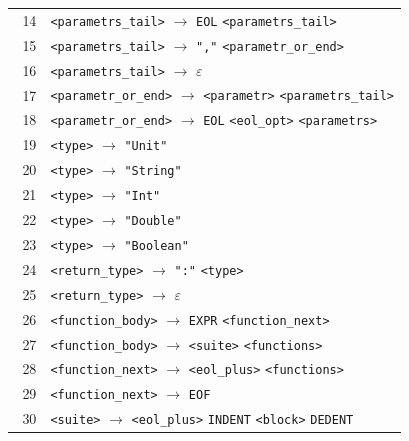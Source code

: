 \documentclass[11pt,a4paper]{article}
\begin{document}
\begin{longtable}{@{}r@{\quad}>{\raggedright\arraybackslash}p{0.91\linewidth}@{}}
14 & \texttt{\textless{}parametrs\_tail\textgreater{}} $\rightarrow$ \texttt{EOL} \texttt{\textless{}parametrs\_tail\textgreater{}} \\
15 & \texttt{\textless{}parametrs\_tail\textgreater{}} $\rightarrow$ \texttt{","} \texttt{\textless{}parametr\_or\_end\textgreater{}} \\
16 & \texttt{\textless{}parametrs\_tail\textgreater{}} $\rightarrow$ $\varepsilon$ \\
17 & \texttt{\textless{}parametr\_or\_end\textgreater{}} $\rightarrow$ \texttt{\textless{}parametr\textgreater{}} \texttt{\textless{}parametrs\_tail\textgreater{}} \\
18 & \texttt{\textless{}parametr\_or\_end\textgreater{}} $\rightarrow$ \texttt{EOL} \texttt{\textless{}eol\_opt\textgreater{}} \texttt{\textless{}parametrs\textgreater{}} \\
19 & \texttt{\textless{}type\textgreater{}} $\rightarrow$ \texttt{"Unit"} \\
20 & \texttt{\textless{}type\textgreater{}} $\rightarrow$ \texttt{"String"} \\
21 & \texttt{\textless{}type\textgreater{}} $\rightarrow$ \texttt{"Int"} \\
22 & \texttt{\textless{}type\textgreater{}} $\rightarrow$ \texttt{"Double"} \\
23 & \texttt{\textless{}type\textgreater{}} $\rightarrow$ \texttt{"Boolean"} \\
24 & \texttt{\textless{}return\_type\textgreater{}} $\rightarrow$ \texttt{":"} \texttt{\textless{}type\textgreater{}} \\
25 & \texttt{\textless{}return\_type\textgreater{}} $\rightarrow$ $\varepsilon$ \\
26 & \texttt{\textless{}function\_body\textgreater{}} $\rightarrow$ \texttt{EXPR} \texttt{\textless{}function\_next\textgreater{}} \\
27 & \texttt{\textless{}function\_body\textgreater{}} $\rightarrow$ \texttt{\textless{}suite\textgreater{}} \texttt{\textless{}functions\textgreater{}} \\
28 & \texttt{\textless{}function\_next\textgreater{}} $\rightarrow$ \texttt{\textless{}eol\_plus\textgreater{}} \texttt{\textless{}functions\textgreater{}} \\
29 & \texttt{\textless{}function\_next\textgreater{}} $\rightarrow$ \texttt{EOF} \\
30 & \texttt{\textless{}suite\textgreater{}} $\rightarrow$ \texttt{\textless{}eol\_plus\textgreater{}} \texttt{INDENT} \texttt{\textless{}block\textgreater{}} \texttt{DEDENT} \\

\end{longtable}
\end{document}
